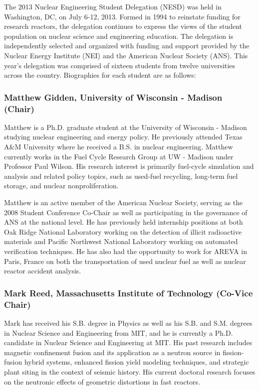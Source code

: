 The 2013 Nuclear Engineering Student Delegation (NESD) was held in Washington,
DC, on July 6-12, 2013. Formed in 1994 to reinstate funding for research
reactors, the delegation continues to express the views of the student
population on nuclear science and engineering education. The delegation is
independently selected and organized with funding and support provided by the
Nuclear Energy Institute (NEI) and the American Nuclear Society (ANS). This
year’s delegation was comprised of sixteen students from twelve universities
across the country. Biographies for each student are as follows:

\subsubsection*{Matthew Gidden, University of Wisconsin - Madison (Chair)}

Matthew is a Ph.D. graduate student at the University of Wisconsin - Madison
studying nuclear engineering and energy policy. He previously attended Texas
A\&M University where he received a B.S. in nuclear engineering. Matthew
currently works in the Fuel Cycle Research Group at UW - Madison under Professor
Paul Wilson. His research interest is primarily fuel-cycle simulation and
analysis and related policy topics, such as used-fuel recycling, long-term fuel
storage, and nuclear nonproliferation.

Matthew is an active member of the American Nuclear Society, serving as the 2008
Student Conference Co-Chair as well as participating in the governance of ANS at
the national level. He has previously held internship positions at both Oak
Ridge National Laboratory working on the detection of illicit radioactive
materials and Pacific Northwest National Laboratory working on automated
verification techniques. He has also had the opportunity to work for AREVA in
Paris, France on both the transportation of used nuclear fuel as well as nuclear
reactor accident analysis.

\subsubsection*{Mark Reed, Massachusetts Institute of Technology (Co-Vice Chair)}

Mark has received his S.B. degree in Physics as well as his S.B. and
S.M. degrees in Nuclear Science and Engineering from MIT, and he is currently a
Ph.D. candidate in Nuclear Science and Engineering at MIT. His past research
includes magnetic confinement fusion and its application as a neutron source in
fission-fusion hybrid systems, enhanced fission yield modeling techniques, and
strategic plant siting in the context of seismic history. His current doctoral
research focuses on the neutronic effects of geometric distortions in fast
reactors.

